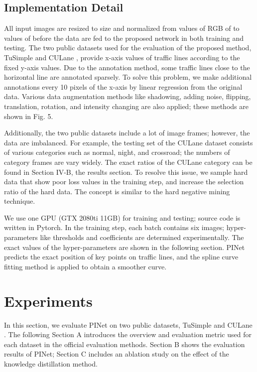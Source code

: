 \documentclass[journal]{IEEEtran}
\begin{document}
\subsection{Implementation Detail}
All input images are resized to  size and normalized from values of RGB of  to values of  before the data are fed to the proposed network in both training and testing. The two public datasets used for the evaluation of the proposed method, TuSimple \cite{tuSimple} and CULane \cite{pan2018spatial}, provide x-axis values of traffic lines according to the fixed y-axis values. Due to the annotation method, some traffic lines close to the horizontal line are annotated sparsely. To solve this problem, we make additional annotations every 10 pixels of the x-axis by linear regression from the original data. Various data augmentation methods like shadowing, adding noise, flipping, translation, rotation, and intensity changing are also applied; these methods are shown in Fig. 5. 

Additionally, the two public datasets include a lot of image frames; however, the data are imbalanced. For example, the testing set of the CULane dataset consists of various categories such as normal, night, and crossroad; the numbers of category frames are vary widely. The exact ratios of the CULane category can be found in Section IV-B, the results section. To resolve this issue, we sample hard data that show poor loss values in the training step, and increase the selection ratio of the hard data. The concept is similar to the hard negative mining technique.

We use one GPU (GTX 2080ti 11GB) for training and testing; source code is written in Pytorch. In the training step, each batch contains six images; hyper-parameters like thresholds and coefficients are determined experimentally. The exact values of the hyper-parameters are shown in the following section. PINet predicts the exact position of key points on traffic lines, and the spline curve fitting method is applied to obtain a smoother curve.






\section{Experiments}
In this section, we evaluate PINet on two public datasets, TuSimple \cite{tuSimple} and CULane \cite{pan2018spatial}. The following Section A introduces the overview and evaluation metric used for each dataset in the official evaluation methods. Section B shows the evaluation results of PINet; Section C includes an ablation study on the effect of the knowledge distillation method.
\end{document}
